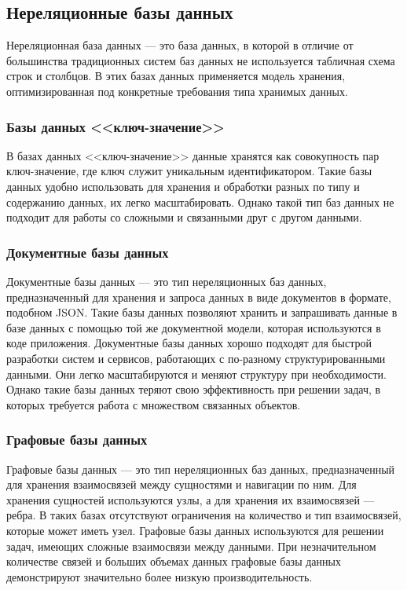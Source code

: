 \subsection{Нереляционные базы данных}

Нереляционная база данных --- это база данных, в которой в отличие от большинства традиционных систем баз данных не используется табличная схема строк и столбцов. В этих базах данных применяется модель хранения, оптимизированная под конкретные требования типа хранимых данных.

\subsubsection{Базы данных <<ключ-значение>>}

В базах данных <<ключ-значение>> данные хранятся как совокупность пар ключ-значение, где ключ служит уникальным идентификатором. Такие базы данных удобно использовать для хранения и обработки разных по типу и содержанию данных, их легко масштабировать. Однако такой тип баз данных не подходит для работы со сложными и связанными друг с другом данными.

\subsubsection{Документные базы данных}

Документные базы данных --- это тип нереляционных баз данных, предназначенный для хранения и запроса данных в виде документов в формате, подобном JSON. Такие базы данных позволяют хранить и запрашивать данные в базе данных с помощью той же документной модели, которая используются в коде приложения. Документные базы данных хорошо подходят для быстрой разработки систем и сервисов, работающих с по-разному структурированными данными. Они легко масштабируются и меняют структуру при необходимости. Однако такие базы данных теряют свою эффективность при решении задач, в которых требуется работа с множеством связанных объектов.

\subsubsection{Графовые базы данных}

Графовые базы данных --- это тип нереляционных баз данных, предназначенный для хранения взаимосвязей между сущностями и навигации по ним. Для хранения сущностей используются узлы, а для хранения их взаимосвязей --- ребра. В таких базах отсутствуют ограничения на количество и тип взаимосвязей, которые может иметь узел. Графовые базы данных используются для решении задач, имеющих сложные взаимосвязи между данными. При незначительном количестве связей и больших объемах данных графовые базы данных демонстрируют значительно более низкую производительность.

